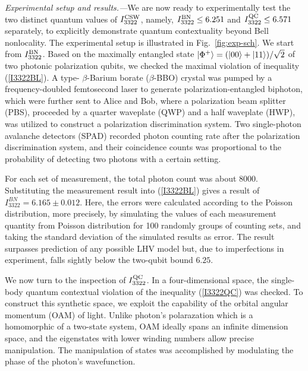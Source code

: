 \documentclass[prl,letterpaper,english,reprint,nofootinbib,aps,superscriptaddress,showpacs,showkeys]{revtex4-1}
\theoremstyle{definition}
\theoremstyle{remark}
\newcommand{\rom}[1]{\MakeUppercase{\romannumeral #1}}
\begin{document}
 \emph{Experimental setup and results.---}We are now ready to experimentally test the two distinct quantum values of $I^{\rm CSW}_{3322}$, namely, $I_{3322}^{\rm BN}\leq6.251$ and $I_{3322}^{\rm QC}\leq6.571$ separately, to explicitly demonstrate quantum contextuality beyond Bell nonlocality. The experimental setup is illustrated in Fig.~\ref{fig:exp-sch}. We start from $I_{3322}^{\rm BN}$. Based on the maximally entangled state $\ket{\Phi^+}=(|00\rangle+|11\rangle)/\sqrt{2}$ of two photonic polarization qubits, we checked the maximal violation of inequality (\ref{I3322BL}).
 A type-\rom{2} $\beta$-Barium borate ($\beta$-BBO) crystal was pumped by a frequency-doubled femtosecond laser to generate  polarization-entangled biphoton, which were further sent to Alice and Bob, where a polarization beam splitter (PBS), proceeded by a quarter waveplate (QWP) and a half waveplate (HWP), was utilized to construct a polarization discrimination system.
 Two single-photon avalanche detectors (SPAD) recorded photon counting rate after the polarization discrimination system, and their coincidence counts was proportional to the probability of detecting two photons with a certain setting.



For each set of measurement, the total photon count was about $8000$. Substituting the measurement result into (\ref{I3322BL}) gives a result of $I_{3322}^{BN}=6.165 \pm 0.012$. Here, the errors were calculated according to the Poisson distribution, more precisely, by simulating the values of each measurement quantity from Poisson distribution for 100 randomly groups of counting sets, and taking the standard deviation of the simulated results as error. The result surpasses prediction of any possible LHV model but, due to imperfections in experiment, falls sightly below the two-qubit bound $6.25$.


 We now turn to the inspection of $I_{3322}^{\rm QC}$. In a four-dimensional space, the single-body quantum contextual violation of the inequality (\ref{I3322QC}) was checked.
 To construct this synthetic space, we exploit the capability of the orbital angular momentum (OAM) of light. Unlike photon's polarazation which is a homomorphic of a two-state system, OAM ideally spans an infinite dimension space, and the eigenstates with lower winding numbers allow precise manipulation.
 The manipulation of states was accomplished by modulating the phase of the photon's wavefunction.
\end{document}
